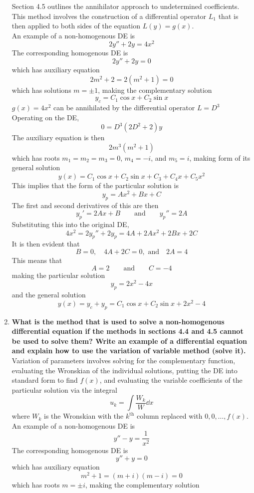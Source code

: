 \documentclass[12pt]{article}
\newcommand{\supt}[2]{#1^{\text{#2}}}
\begin{document}
\begin{enumerate}
			Section 4.5 outlines the annihilator approach to undetermined coefficients. This method involves the construction of a differential operator \(L_1\) that is then applied to both sides of the equation \(L(y) = g(x)\). \\
			An example of a non-homogenous DE is
				\[2y'' + 2y = 4x^2\]
				The corresponding homogenous DE is
				\[2y'' + 2y = 0\]
				which has auxiliary equation
				\[2m^2 + 2 = 2(m^2 + 1) = 0\] 
				which has solutions \(m = \pm 1\), making the complementary solution
				\[y_c = C_1\cos x + C_2\sin x\]
				\(g(x) = 4x^2\) can be annihilated by the differential operator \(L = D^3\)
				Operating on the DE,
				\[0 = D^3(2D^2 + 2)y\]
				The auxiliary equation is then
				\[2m^3(m^2 + 1)\]
				which has roots \(m_1 = m_2 = m_3 = 0\), \(m_4 = -i\), and \(m_5 = i\), making form of its general solution
				\[y(x) = C_1\cos x + C_2\sin x + C_3 + C_4x + C_5x^2\]
				This implies that the form of the particular solution is
				\[y_p = Ax^2 + Bx + C\]
				The first and second derivatives of this are then
				\[
					y_p' = 2Ax + B \qquad \text{and} \qquad
					y_p'' = 2A
				\]
				Substituting this into the original DE,
				\[
					4x^2 = 2y_p'' + 2y_p
						= 4A + 2Ax^2 + 2Bx + 2C
				\]
				It is then evident that
				\[B = 0, \quad 4A + 2C = 0,\text{ and} \quad 2A = 4\]
				This means that
				\[A = 2 \qquad \text{and} \qquad C = -4\]
				making the particular solution
				\[y_p = 2x^2 - 4x\]
				and the general solution
				\[y(x) = y_c + y_p = C_1\cos x + C_2\sin x + 2x^2 - 4\]
		\item \textbf{What is the method that is used to solve a non-homogenous differential equation if the methods in sections 4.4 and 4.5 cannot be used to solve them? Write an example of a differential equation and explain how to use the variation of variable method (solve it).} \\
			Variation of parameters involves solving for the complementary function, evaluating the Wronskian of the individual solutions, putting the DE into standard form to find \(f(x)\), and evaluating the variable coefficients of the particular solution via the integral
				\[u_k = \int \frac{W_k}{W} \dd{x}\]
				where \(W_k\) is the  Wronskian with the \(\supt{k}{th}\) column replaced with \(0, 0, \ldots, f(x)\). \\
			An example of a non-homogenous DE is
				\[y'' - y = \frac{1}{x^2}\]
				The corresponding homogenous DE is
				\[y'' + y = 0\]
				which has auxiliary equation
				\[m^2 + 1 = (m + i)(m - i) = 0\]
				which has roots \(m = \pm i\), making the complementary solution

\end{enumerate}
\end{document}
